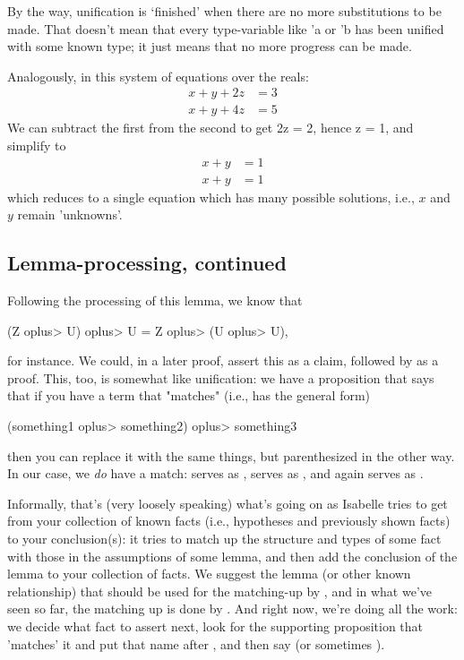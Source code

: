 By the way, unification is `finished' when there are no more substitutions to be made. That doesn't mean that every type-variable like 'a or 'b has been unified with some known type; it just means that no more progress can be made. 

Analogously, in this system of equations over the reals:
\begin{align}
x + y + 2z &= 3 \\
x + y + 4z &= 5
\end{align}
We can subtract the first from the second to get 2z = 2, hence z = 1, and simplify to 
\begin{align}
x + y &= 1\\
x + y &= 1
\end{align}
\noindent
which reduces to a single equation which has many possible solutions, i.e., $x$ and $y$ remain 'unknowns'. 

\subsection{Lemma-processing, continued}
Following the processing of this lemma, we know that
\begin{IS}
(Z \<oplus> U) \<oplus> U = Z \<oplus>  (U \<oplus> U),
\end{IS}for instance. We could, in a later proof, assert this as a claim, followed by  as a proof. This, too, is somewhat like unification: we have a proposition that says that if you have a term that "matches" (i.e., has the general form) 
\begin{IS}
   (something1  \<oplus> something2)  \<oplus> something3
\end{IS}
then you can replace it with the same things, but parenthesized in the other way. In our case, we \textit{do} have a match:  serves as ,  serves as , and  again serves as . 

Informally, that's (very loosely speaking) what's going on as Isabelle tries to get from your collection of known facts (i.e., hypotheses and previously shown facts) to your conclusion(s): it tries to match up the structure and types of some fact with those in the assumptions of some lemma, and then add the conclusion of the lemma to your collection of facts. We suggest the lemma (or other known relationship) that should be used for the matching-up by , and in what we've seen so far, the matching up is done by . And right now, we're doing all the work: we decide what fact to assert next, look for the supporting proposition that 'matches' it and put that name after , and then say  (or sometimes ). 

